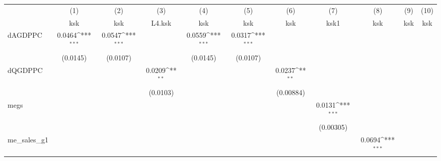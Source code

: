{
\def\sym#1{\ifmmode^{#1}\else\(^{#1}\)\fi}
\begin{tabular}{l*{10}{c}}
\hline\hline
            &\multicolumn{1}{c}{(1)}&\multicolumn{1}{c}{(2)}&\multicolumn{1}{c}{(3)}&\multicolumn{1}{c}{(4)}&\multicolumn{1}{c}{(5)}&\multicolumn{1}{c}{(6)}&\multicolumn{1}{c}{(7)}&\multicolumn{1}{c}{(8)}&\multicolumn{1}{c}{(9)}&\multicolumn{1}{c}{(10)}\\
            &\multicolumn{1}{c}{ksk}&\multicolumn{1}{c}{ksk}&\multicolumn{1}{c}{L4.ksk}&\multicolumn{1}{c}{ksk}&\multicolumn{1}{c}{ksk}&\multicolumn{1}{c}{ksk}&\multicolumn{1}{c}{ksk1}&\multicolumn{1}{c}{ksk}&\multicolumn{1}{c}{ksk}&\multicolumn{1}{c}{ksk}\\
\hline
dAGDPPC     &      0.0464\sym{***}&      0.0547\sym{***}&                     &      0.0559\sym{***}&      0.0317\sym{***}&                     &                     &                     &                     &                     \\
            &    (0.0145)         &    (0.0107)         &                     &    (0.0145)         &    (0.0107)         &                     &                     &                     &                     &                     \\
[1em]
dQGDPPC     &                     &                     &      0.0209\sym{**} &                     &                     &      0.0237\sym{**} &                     &                     &                     &                     \\
            &                     &                     &    (0.0103)         &                     &                     &   (0.00884)         &                     &                     &                     &                     \\
[1em]
megs        &                     &                     &                     &                     &                     &                     &      0.0131\sym{***}&                     &                     &                     \\
            &                     &                     &                     &                     &                     &                     &   (0.00305)         &                     &                     &                     \\
[1em]
me\_sales\_g1 &                     &                     &                     &                     &                     &                     &                     &      0.0694\sym{***}&                     &                     \\

\end{tabular}}
